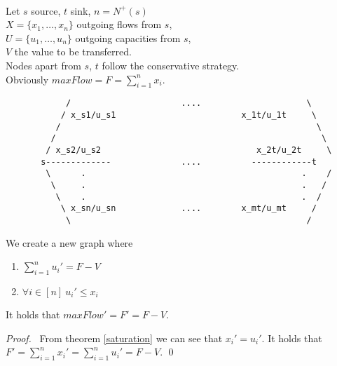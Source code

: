 \documentclass[11pt]{llncs}
\begin{document}
    \begin{theorem} \ \\
       \label{trusttransfer}
       Let $s$ source, $t$ sink, $n = N^{+}(s)$ \\
       $X = \{x_1, \dots, x_n\}$ outgoing flows from $s$, \\
       $U = \{u_1, \dots, u_n\}$ outgoing capacities from $s$, \\
       $V$ the value to be transferred. \\
       Nodes apart from $s$, $t$ follow the conservative strategy. \\
       Obviously $maxFlow = F = \sum\limits_{i=1}^{n}{x_i}$.
       {\em \begin{lstlisting}
            /                      ....                     \
           / x_s1/u_s1                         x_1t/u_1t     \
          /                                                   \
         /                                                     \
        / x_s2/u_s2                               x_2t/u_2t     \
       s-------------              ....          ------------t
        \      .                                           .    /
         \     .                                           .   /
          \    .                                           .  /
           \ x_sn/u_sn             ....        x_mt/u_mt     /
            \                                               /
       \end{lstlisting}}
       We create a new graph where
       \begin{enumerate}
         \item  $\sum\limits_{i=1}^{n}{u_i'} = F - V$
         \item $\forall i \in [n] \: u_i' \leq x_i$
       \end{enumerate}

       It holds that $maxFlow' = F' = F - V$.
    \end{theorem}
    \begin{proof} \
        From theorem \ref{saturation} we can see that $x_i' = u_i'$. It holds that $F' = \sum\limits_{i=1}^nx_i' =
        \sum\limits_{i=1}^nu_i' = F - V$. \qed
    \end{proof}

\end{document}
